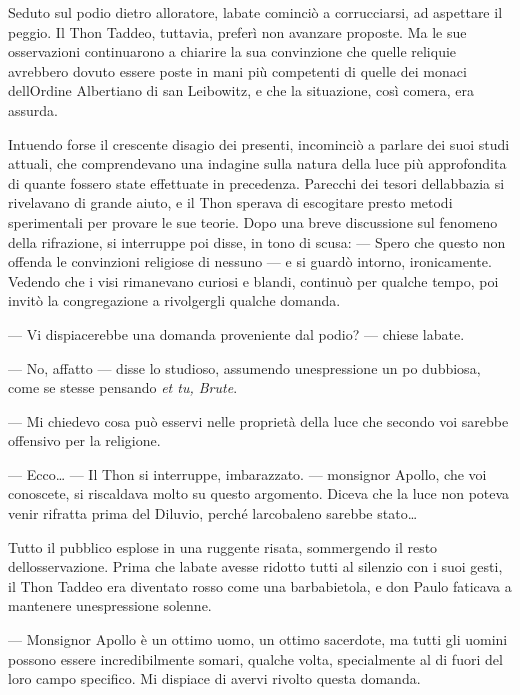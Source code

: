 Seduto sul podio dietro all\textquotesingle oratore,
l\textquotesingle abate cominciò a corrucciarsi, ad aspettare il peggio.
Il Thon Taddeo, tuttavia, preferì non avanzare proposte. Ma le sue
osservazioni continuarono a chiarire la sua convinzione che quelle
reliquie avrebbero dovuto essere poste in mani più competenti di quelle
dei monaci dell\textquotesingle Ordine Albertiano di san Leibowitz, e
che la situazione, così com\textquotesingle era, era assurda.

Intuendo forse il crescente disagio dei presenti, incominciò a parlare
dei suoi studi attuali, che comprendevano una indagine sulla natura
della luce più approfondita di quante fossero state effettuate in
precedenza. Parecchi dei tesori dell\textquotesingle abbazia si
rivelavano di grande aiuto, e il Thon sperava di escogitare presto
metodi sperimentali per provare le sue teorie. Dopo una breve
discussione sul fenomeno della rifrazione, si interruppe poi disse, in
tono di scusa: --- Spero che questo non offenda le convinzioni religiose
di nessuno --- e si guardò intorno, ironicamente. Vedendo che i visi
rimanevano curiosi e blandi, continuò per qualche tempo, poi invitò la
congregazione a rivolgergli qualche domanda.

--- Vi dispiacerebbe una domanda proveniente dal podio? --- chiese
l\textquotesingle abate.

--- No, affatto --- disse lo studioso, assumendo
un\textquotesingle espressione un po\textquotesingle{} dubbiosa, come se
stesse pensando \emph{et tu, Brute}.

--- Mi chiedevo cosa può esservi nelle proprietà della luce che secondo
voi sarebbe offensivo per la religione.

--- Ecco\ldots{} --- Il Thon si interruppe, imbarazzato. --- monsignor
Apollo, che voi conoscete, si riscaldava molto su questo argomento.
Diceva che la luce non poteva venir rifratta prima del Diluvio, perché
l\textquotesingle arcobaleno sarebbe stato\ldots{}

Tutto il pubblico esplose in una ruggente risata, sommergendo il resto
dell\textquotesingle osservazione. Prima che l\textquotesingle abate
avesse ridotto tutti al silenzio con i suoi gesti, il Thon Taddeo era
diventato rosso come una barbabietola, e don Paulo faticava a mantenere
un\textquotesingle espressione solenne.

--- Monsignor Apollo è un ottimo uomo, un ottimo sacerdote, ma tutti gli
uomini possono essere incredibilmente somari, qualche volta,
specialmente al di fuori del loro campo specifico. Mi dispiace di avervi
rivolto questa domanda.

